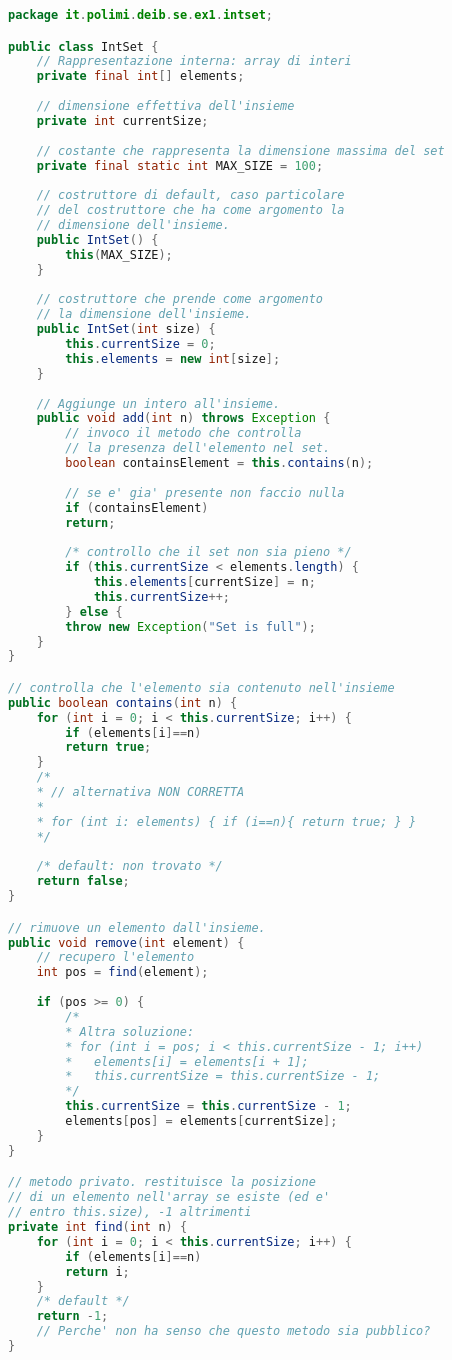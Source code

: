 \documentclass{article}
\begin{document}
\begin{lstlisting}[language=Java,escapechar=|]
package it.polimi.deib.se.ex1.intset;

public class IntSet {
	// Rappresentazione interna: array di interi
	private final int[] elements;
	
	// dimensione effettiva dell'insieme
	private int currentSize;
	
	// costante che rappresenta la dimensione massima del set
	private final static int MAX_SIZE = 100;
	
	// costruttore di default, caso particolare
	// del costruttore che ha come argomento la
	// dimensione dell'insieme.
	public IntSet() {
		this(MAX_SIZE);
	}
	
	// costruttore che prende come argomento
	// la dimensione dell'insieme.
	public IntSet(int size) {
		this.currentSize = 0;
		this.elements = new int[size];
	}
	
	// Aggiunge un intero all'insieme.
	public void add(int n) throws Exception {
		// invoco il metodo che controlla
		// la presenza dell'elemento nel set.
		boolean containsElement = this.contains(n);
		
		// se e' gia' presente non faccio nulla
		if (containsElement)
		return;
		
		/* controllo che il set non sia pieno */
		if (this.currentSize < elements.length) {
			this.elements[currentSize] = n;
			this.currentSize++;
		} else {
		throw new Exception("Set is full");
	}
}

// controlla che l'elemento sia contenuto nell'insieme
public boolean contains(int n) {
	for (int i = 0; i < this.currentSize; i++) {
		if (elements[i]==n)
		return true;
	}
	/*
	* // alternativa NON CORRETTA
	*
	* for (int i: elements) { if (i==n){ return true; } }
	*/
	
	/* default: non trovato */
	return false;
}

// rimuove un elemento dall'insieme.
public void remove(int element) {
	// recupero l'elemento
	int pos = find(element);
	
	if (pos >= 0) {
		/*
		* Altra soluzione:
		* for (int i = pos; i < this.currentSize - 1; i++)
		*	elements[i] = elements[i + 1];
		*	this.currentSize = this.currentSize - 1;
		*/						
		this.currentSize = this.currentSize - 1;
		elements[pos] = elements[currentSize];
	}
}

// metodo privato. restituisce la posizione
// di un elemento nell'array se esiste (ed e'
// entro this.size), -1 altrimenti
private int find(int n) {
	for (int i = 0; i < this.currentSize; i++) {
		if (elements[i]==n)
		return i;
	}
	/* default */
	return -1;
	// Perche' non ha senso che questo metodo sia pubblico?
}


\end{lstlisting}
\end{document}
